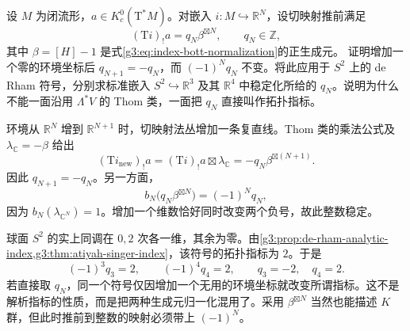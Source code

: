 \begin{optionalexercise}\label{g3:ex:index-bott-stabilization}
	设 \(M\) 为闭流形，\(a\in K_c^0(\mathrm T^*M)\)。对嵌入
	\(i:M\hookrightarrow\mathbb R^N\)，设切映射推前满足
	\[
		(\mathrm Ti)_!a=q_N\beta^{\boxtimes N},
		\qquad q_N\in\mathbb Z,
	\]
	其中 \(\beta=[H]-1\) 是式\eqref{g3:eq:index-bott-normalization}的正生成元。
	证明增加一个零的环境坐标后 \(q_{N+1}=-q_N\)，而
	\((-1)^Nq_N\) 不变。将此应用于 \(S^2\) 上的 de Rham 符号，分别求标准嵌入 \(S^2\hookrightarrow\mathbb R^3\) 及其 \(\mathbb R^4\) 中稳定化所给的 \(q_N\)。说明为什么不能一面沿用 \(\Lambda^*V\) 的 Thom 类，一面把 \(q_N\) 直接叫作拓扑指标。
\end{optionalexercise}
\begin{solution}
	环境从 \(\mathbb R^N\) 增到 \(\mathbb R^{N+1}\) 时，切映射法丛增加一条复直线。Thom 类的乘法公式及
	\(\lambda_{\mathbb C}=-\beta\) 给出
	\[
		(\mathrm Ti_{\mathrm{new}})_!a
		=(\mathrm Ti)_!a\boxtimes\lambda_{\mathbb C}
		=-q_N\beta^{\boxtimes(N+1)}.
	\]
	因此 \(q_{N+1}=-q_N\)。另一方面，
	\[
		b_N\bigl(q_N\beta^{\boxtimes N}\bigr)
		=(-1)^Nq_N,
	\]
	因为 \(b_N(\lambda_{\mathbb C^N})=1\)。增加一个维数恰好同时改变两个负号，故此整数稳定。

	球面 \(S^2\) 的实上同调在 \(0,2\) 次各一维，其余为零。由\cref{g3:prop:de-rham-analytic-index,g3:thm:atiyah-singer-index}，该符号的拓扑指标为 \(2\)。于是
	\[
		(-1)^3q_3=2,\qquad (-1)^4q_4=2,
		\qquad q_3=-2,\quad q_4=2.
	\]
	若直接取 \(q_N\)，同一个符号仅因增加一个无用的环境坐标就改变所谓指标。这不是解析指标的性质，而是把两种生成元归一化混用了。采用 \(\beta^{\boxtimes N}\) 当然也能描述 \(K\) 群，但此时推前到整数的映射必须带上 \((-1)^N\)。
\end{solution}

